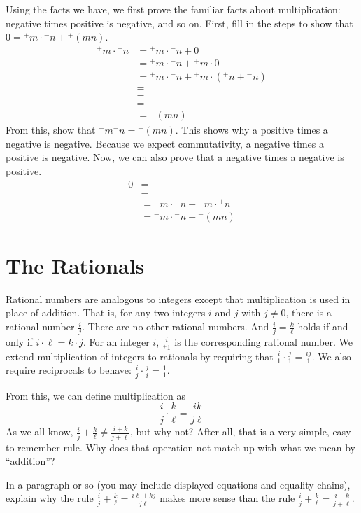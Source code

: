 \documentclass[10pt,oneside,tightlist]{memoir}
\begin{document}
Using the facts we have, we first prove the familiar facts about multiplication: negative times positive is negative,
and so on.
First, fill in the steps to show that $0 = {}^+m\cdot{}^-n + {}^+(mn)$. 
\begin{align*}
  {}^+m\cdot {}^-n &= {}^+m\cdot {}^-n + 0\\
    &= {}^+m\cdot {}^-n + {}^+m\cdot 0\\
    &= {}^+m\cdot {}^-n + {}^+m\cdot ({}^+n + {}^-n)\\
    &= \\
    &= \\
    &= \\
    &= {}^-(mn)
\end{align*}
From this, show that ${}^+m{}^-n = {}^-(mn)$. 
This shows why a positive times a negative is negative.
Because we expect commutativity, a negative times a positive is negative.
Now, we can also prove that a negative times a negative is positive.
\begin{align*}
  0 &= \\
    &= \\
    &= {}^-m\cdot {}^-n + {}^-m\cdot {}^+n\\
    &= {}^-m\cdot {}^-n + {}^-(mn)
\end{align*}

\section{The Rationals}

Rational numbers are analogous to integers except that multiplication is used in place of addition.
That is, for any two integers $i$ and $j$ with $j\neq 0$, there is a rational number $\frac{i}{j}$.
There are no other rational numbers. And $\frac{i}{j} = \frac{k}{\ell}$ holds if and only if 
$i\cdot\ell = k\cdot j$. For an integer $i$, $\frac{i}{{}^+1}$ is the corresponding rational number.
We extend multiplication of integers to rationals by requiring that $\frac{i}{1} \cdot \frac{j}{1} = \frac{ij}{1}$.
We also require reciprocals to behave: $\frac{i}{j}\cdot \frac{j}{i} = \frac{1}{1}$.

From this, we can define multiplication as \[\frac{i}{j} \cdot \frac{k}{\ell} = \frac{ik}{j\ell}\]
As we all know, $\frac{i}{j} + \frac{k}{\ell} \neq \frac{i+k}{j + \ell}$, but why not? 
After all, that is a very simple, easy to remember rule. Why does that operation not 
match up with what we mean by ``addition''? 

\begin{exercise}
In a paragraph or so (you may include displayed equations and equality chains), 
explain why the rule $\frac{i}{j} + \frac{k}{\ell} = \frac{i\ell + kj}{j\ell}$ makes more
sense than the rule $\frac{i}{j} + \frac{k}{\ell} = \frac{i + k}{j + \ell}$. 
\end{exercise}
\end{document}
